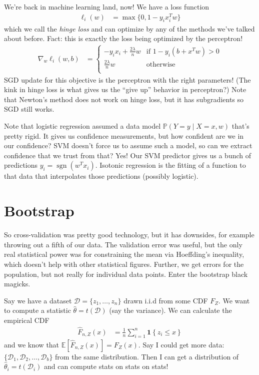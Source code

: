 \documentclass[11pt,letterpaper]{article}
\DeclareMathOperator{\sgn}{sgn}
\theoremstyle{definition}
\theoremstyle{plain}
\numberwithin{equation}{section}
\numberwithin{figure}{section}
\begin{document}
We're back in machine learning land, now! We have a loss function
%
\begin{align}
	\ell_i(w) &= \max\{0, 1 - y_i x_i^T w\}
\end{align}
%
which we call the \emph{hinge loss} and can optimize by any of the methods we've talked about before. Fact: this is exactly the loss being optimized by the perceptron!
%
\begin{align}
	\nabla_w \ell_i(w,b) &= \left\{
	\begin{array}{ll}
		-y_i x_i + \frac{2\lambda}{n} w & \text{if } 1-y_i(b+x^T w) > 0\\
		\frac{2\lambda}{n} w & \text{otherwise}\\
	\end{array}\right.	
\end{align}
%
SGD update for this objective is the perceptron with the right parameters! (The kink in hinge loss is what gives us the ``give up'' behavior in perceptron?) Note that Newton's method does not work on hinge loss, but it has subgradients so SGD still works.


Note that logistic regression assumed a data model $\mathbb{P}(Y=y \mid X=x, w)$ that's pretty rigid. It gives us confidence measurements, but how confident are we in our confidence? SVM doesn't force us to assume such a model, so can we extract confidence that we trust from that? Yes! Our SVM predictor gives us a bunch of predictions $y_i = \sgn(w^T x_i)$. Isotonic regression is the fitting of a function to that data that interpolates those predictions (possibly logistic).






\section{Bootstrap}
So cross-validation was pretty good technology, but it has downsides, for example throwing out a fifth of our data. The validation error was useful, but the only real statistical power was for constraining the mean via Hoeffding's inequality, which doesn't help with other statistical figures. Further, we get errors for the population, but not really for individual data points. Enter the bootstrap black magicks.

Say we have a dataset $\mathcal{D} = \{z_1,\ldots,z_n\}$ drawn i.i.d from some CDF $F_Z$. We want to compute a statistic $\hat{\theta} = t(\mathcal{D})$ (say the variance). We can calculate the empirical CDF
%
\begin{align}
	\hat{F}_{n,Z}(x) &= \frac{1}{n} \sum_{i=1}^n \bm{1}\left\{z_i \leq x\right\}
\end{align}
%
and we know that $\mathbb{E}\left[\hat{F}_{n,Z}(x)\right] = F_Z(x)$. Say I could get more data: $\{\mathcal{D}_1,\mathcal{D}_2,\ldots,\mathcal{D}_b\}$ from the same distribution. Then I can get a distribution of $\hat{\theta}_i = t(\mathcal{D}_i)$ and can compute stats on stats on stats!
\end{document}
